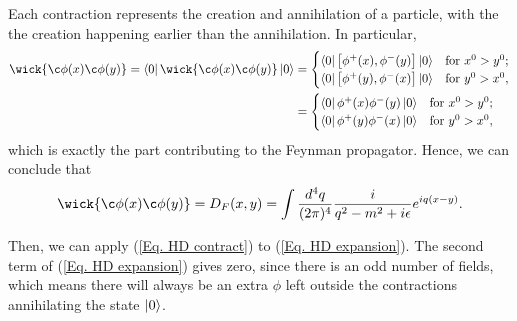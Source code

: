 \documentclass[11pt]{article}
\theoremstyle{definition}
\begin{document}
Each contraction represents the creation and annihilation of a particle, with the the creation happening earlier than the annihilation. In particular,
\begin{equation}
\begin{aligned}
        \wick{\c\phi(x)\c\phi(y)}=\bra{0}\wick{\c\phi(x)\c\phi(y)}\ket{0}&=
        \begin{cases} 
        \bra{0}\big[\phi^+(x), \phi^-(y)\big]\ket{0} & \text{for } x^0 > y^0; \\ 
        \bra{0}\big[\phi^+(y), \phi^-(x)\big]\ket{0} & \text{for } y^0 > x^0,
    \end{cases}
    \\
    &=
    \begin{cases}
        \bra{0}\phi^+(x)\phi^-(y)\ket{0} & \text{for } x^0 > y^0; \\ 
        \bra{0}\phi^+(y)\phi^-(x)\ket{0} & \text{for } y^0 > x^0,
    \end{cases}
\end{aligned}
\end{equation}
which is exactly the part contributing to the Feynman propagator. Hence, we can conclude that
\begin{equation}
    \wick{\c\phi(x)\c\phi(y)} = D_F(x, y) = \int \frac{d^4q }{(2\pi)^4} \frac{i}{q^2 - m^2 +i\epsilon} e^{iq(x-y)}.
\end{equation}

Then, we can apply (\ref{Eq. HD contract}) to (\ref{Eq. HD expansion}). The second term of (\ref{Eq. HD expansion}) gives zero, since there is an odd number of fields, which means there will always be an extra $\phi$ left outside the contractions annihilating the state $\ket{0}$.
\end{document}
